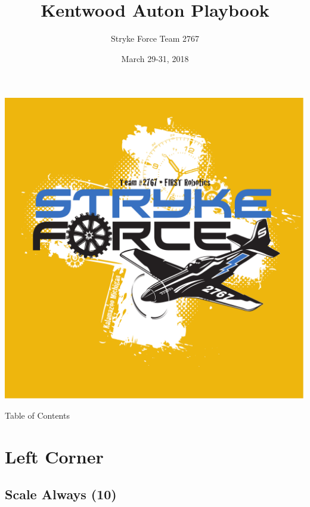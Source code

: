 \documentclass{beamer}
\title{Kentwood Auton Playbook}
\author{Stryke Force Team 2767}
\date{March 29-31, 2018}
\begin{document}
\begin{frame}
 \center\includegraphics[scale=0.15]{assets/strykeforce}
 \titlepage
\end{frame}
\begin{frame}[t]{Table of Contents}
 \tableofcontents
\end{frame}
\section{Left Corner}
\subsection{Scale Always (10)}
\end{document}

